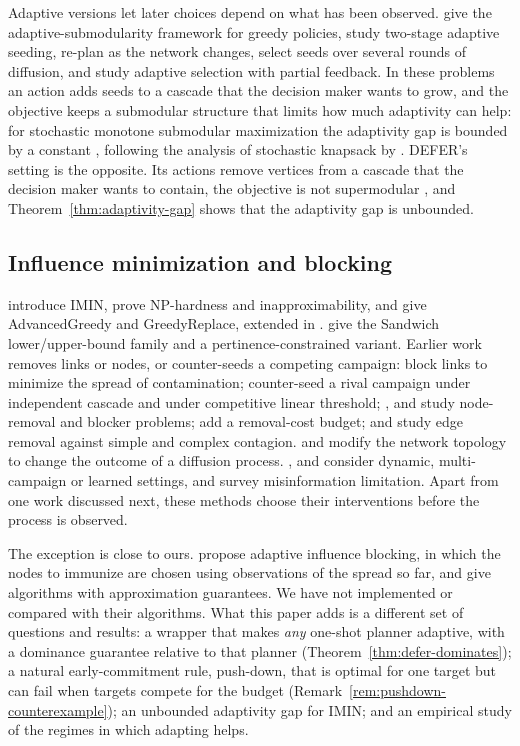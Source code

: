 \documentclass[11pt]{article}
\theoremstyle{definition}
\theoremstyle{remark}
\begin{document}
Adaptive versions let later choices depend on what has been observed. \citet{golovinkrause2011} give the adaptive-submodularity framework for greedy policies, \citet{seemansinger2013} study two-stage adaptive seeding, \citet{tong2017} re-plan as the network changes, \citet{sun2018} select seeds over several rounds of diffusion, and \citet{yuan2017} study adaptive selection with partial feedback. In these problems an action adds seeds to a cascade that the decision maker wants to grow, and the objective keeps a submodular structure that limits how much adaptivity can help: for stochastic monotone submodular maximization the adaptivity gap is bounded by a constant \citep{asadpournazerzadeh2016}, following the analysis of stochastic knapsack by \citet{deangoemansvondrak2008}. DEFER's setting is the opposite. Its actions remove vertices from a cascade that the decision maker wants to contain, the objective is not supermodular \citep{xie2023}, and Theorem~\ref{thm:adaptivity-gap} shows that the adaptivity gap is unbounded.

\subsection{Influence minimization and blocking}

\citet{xie2023} introduce IMIN, prove NP-hardness and inapproximability, and give AdvancedGreedy and GreedyReplace, extended in \citet{xie2024}. \citet{wang2024sandwich} give the Sandwich lower/upper-bound family and \citet{xiang2024} a pertinence-constrained variant. Earlier work removes links or nodes, or counter-seeds a competing campaign: \citet{kimura2008} block links to minimize the spread of contamination; \citet{budak2011} counter-seed a rival campaign under independent cascade and \citet{he2012} under competitive linear threshold; \citet{nguyen2012}, \citet{wang2013blocking} and \citet{yan2020} study node-removal and blocker problems; \citet{fan2013} add a removal-cost budget; and \citet{kuhlman2013} study edge removal against simple and complex contagion. \citet{tong2012} and \citet{khalil2014} modify the network topology to change the outcome of a diffusion process. \citet{wang2016drimux}, \citet{tong2018} and \citet{farajtabar2017} consider dynamic, multi-campaign or learned settings, and \citet{zareie2021} survey misinformation limitation. Apart from one work discussed next, these methods choose their interventions before the process is observed.

The exception is close to ours. \citet{shi2019} propose adaptive influence blocking, in which the nodes to immunize are chosen using observations of the spread so far, and give algorithms with approximation guarantees. We have not implemented or compared with their algorithms. What this paper adds is a different set of questions and results: a wrapper that makes \emph{any} one-shot planner adaptive, with a dominance guarantee relative to that planner (Theorem~\ref{thm:defer-dominates}); a natural early-commitment rule, push-down, that is optimal for one target but can fail when targets compete for the budget (Remark~\ref{rem:pushdown-counterexample}); an unbounded adaptivity gap for IMIN; and an empirical study of the regimes in which adapting helps.
\end{document}
